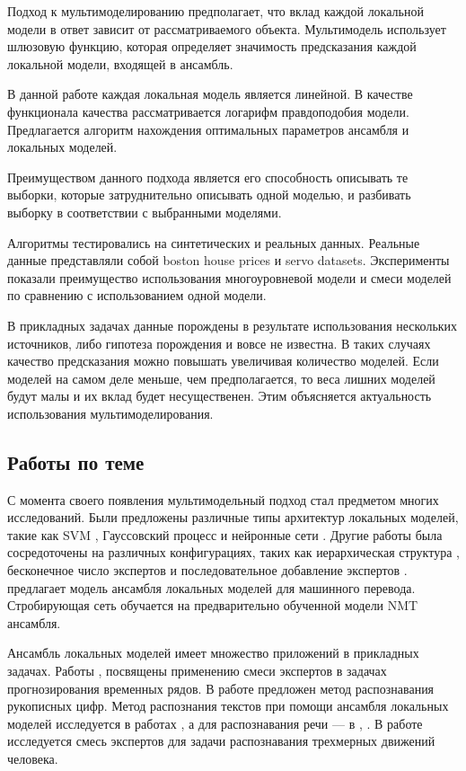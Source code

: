 \documentclass[12pt, twoside]{article}
\begin{document}
Подход к мультимоделированию предполагает, что вклад каждой локальной модели в ответ зависит от рассматриваемого объекта. Мультимодель использует шлюзовую функцию, которая определяет значимость предсказания каждой локальной модели, входящей в ансамбль.

В данной работе каждая локальная модель является линейной. В качестве функционала качества рассматривается логарифм правдоподобия модели. Предлагается алгоритм нахождения оптимальных параметров ансамбля и локальных моделей. 

Преимуществом данного подхода является его способность описывать те выборки, которые затруднительно описывать одной моделью, и разбивать выборку в соответствии с выбранными моделями.

Алгоритмы тестировались на синтетических и реальных данных. Реальные данные представляли собой boston house prices и servo datasets. Эксперименты показали преимущество использования многоуровневой модели и смеси моделей по сравнению с использованием одной модели.


В прикладных задачах данные порождены в результате использования нескольких источников, либо гипотеза порождения и вовсе не известна. В таких случаях качество предсказания можно повышать увеличивая количество моделей. Если моделей на самом деле меньше, чем предполагается, то веса лишних моделей будут малы и их вклад
будет несущественен. Этим объясняется актуальность использования мультимоделирования.

\subsection{Работы по теме}

С момента своего появления мультимодельный подход стал предметом многих исследований. Были предложены различные типы архитектур локальных моделей, такие как SVM \cite{Collobert2002}, Гауссовский процесс \cite{Tresp01mixturesof}  и нейронные сети \cite{Shazeer2017}. Другие работы была сосредоточены на различных конфигурациях, таких как иерархическая структура \cite{NIPS1991_514}, бесконечное число экспертов \cite{Rasmussen} и последовательное добавление экспертов \cite{Aljundi2016}. \cite{garmash-monz-2016-ensemble} предлагает модель ансамбля локальных моделей для машинного перевода. Стробирующая сеть обучается на предварительно обученной модели NMT ансамбля. 

Ансамбль локальных моделей имеет множество приложений в прикладных задачах. Работы \cite{Yumlu2003}, \cite{Cheung1995}\cite{Weigend2000} посвящены применению смеси экспертов в задачах прогнозирования временных
рядов. В работе \cite{article} предложен метод распознавания рукописных цифр. Метод распознания текстов при помощи ансамбля локальных моделей исследуется в работах \cite{Estabrooks2001}, а для распознавания речи --- в \cite{Mossavat2010}, \cite{Peng1996}. В работе \cite{Sminchisescu2007} исследуется смесь экспертов для задачи распознавания трехмерных движений человека.
\end{document}
